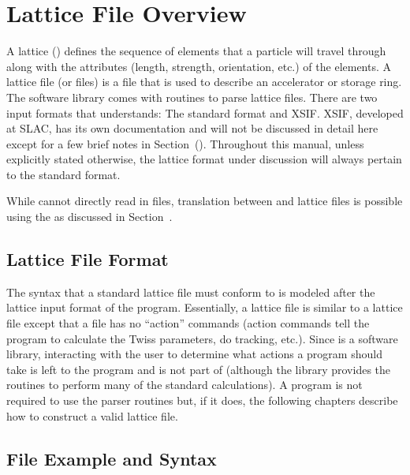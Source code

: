 \chapter{Lattice File Overview}
\label{c:lat.file}

A lattice () defines the sequence of elements
that a particle will travel through along with the attributes (length,
strength, orientation, etc.) of the elements.  A lattice file (or
files) is a file that is used to describe an accelerator or storage
ring. The \bmad software library comes with routines to parse lattice
files. There are two input formats that \bmad understands: The \bmad
standard format and XSIF\cite{b:xsif}. XSIF, developed at SLAC, has
its own documentation and will not be discussed in detail here except
for a few brief notes in Section~().  Throughout this
manual, unless explicitly stated otherwise, the lattice format under
discussion will always pertain to the \bmad standard format.

While \bmad cannot directly read in \mad\cite{b:maduser} files, 
translation between \mad and \bmad lattice files is possible using
the  as discussed in Section~.

\section{Lattice File Format}
\label{s:lattice.file.formats}

The syntax that a \bmad standard lattice file must conform to is
modeled after the lattice input format of the \mad program.
Essentially, a \bmad lattice file is similar to a \mad lattice file
except that a \bmad file has no ``action'' commands (action commands
tell the program to calculate the Twiss parameters, do tracking,
etc.).  Since \bmad is a software library, interacting with the user to 
determine what actions a program
should take is left to the program and is not part of \bmad (although
the \bmad library provides the routines to perform many of the standard
calculations). A program is not required to use the \bmad parser
routines but, if it does, the following chapters describe how to
construct a valid lattice file.

\section{File Example and Syntax}

